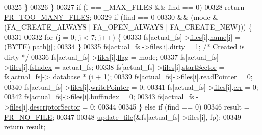 \begin{DoxyCode}
00325     \}
00326   \}
00327   \textcolor{keywordflow}{if} (i == \_MAX\_FILES && find == 0)
00328     \textcolor{keywordflow}{return} \hyperlink{fileSystem_8h_a49d0171ecbd362cda5680a0d360db44cac7926e01d7519a1a7e21a44e2dd76789}{FR\_TOO\_MANY\_FILES};
00329   \textcolor{keywordflow}{if} (find == 0
00330       && (mode & (FA\_CREATE\_ALWAYS | FA\_OPEN\_ALWAYS | FA\_CREATE\_NEW))) \{
00331 
00332     \textcolor{keywordflow}{for} (j = 0; j < 7; j++) \{
00333       fs[actual\_fs]->\hyperlink{structFS_a5772298ea6aafc77f842037933531a02}{files}[i].\hyperlink{structFIL_a21240fe08417eb46f794e67519bf4a58}{name}[j] = (BYTE) path[j];
00334     \}
00335     fs[actual\_fs]->\hyperlink{structFS_a5772298ea6aafc77f842037933531a02}{files}[i].\hyperlink{structFIL_a32847fe875861954ec3dc750d332a194}{dirty} = 1; \textcolor{comment}{/* Created is dirty */}
00336     fs[actual\_fs]->\hyperlink{structFS_a5772298ea6aafc77f842037933531a02}{files}[i].\hyperlink{structFIL_ac409508881f5a16f2998ae675072b376}{flag} = mode;
00337     fs[actual\_fs]->\hyperlink{structFS_a5772298ea6aafc77f842037933531a02}{files}[i].\hyperlink{structFIL_ab32bf8d0b478b2cef4942b2128f4f5f5}{fsIndex} = actual\_fs;
00338     fs[actual\_fs]->\hyperlink{structFS_a5772298ea6aafc77f842037933531a02}{files}[i].\hyperlink{structFIL_a684d4d555f293b08b8396c35e20706d3}{startSector} = fs[actual\_fs]->
      \hyperlink{structFS_a727068deba19f90b5b402ae005f49b58}{database} * (i + 1);
00339     fs[actual\_fs]->\hyperlink{structFS_a5772298ea6aafc77f842037933531a02}{files}[i].\hyperlink{structFIL_ad0d1f48655e0e06936cb7883993afb1f}{readPointer} = 0;
00340     fs[actual\_fs]->\hyperlink{structFS_a5772298ea6aafc77f842037933531a02}{files}[i].\hyperlink{structFIL_a89e92b4845c72b4f9f119b38d1142a41}{writePointer} = 0;
00341     fs[actual\_fs]->\hyperlink{structFS_a5772298ea6aafc77f842037933531a02}{files}[i].\hyperlink{structFIL_aea440945db26de9c4a88065c0c887fda}{err} = 0;
00342     fs[actual\_fs]->\hyperlink{structFS_a5772298ea6aafc77f842037933531a02}{files}[i].\hyperlink{structFIL_a5fb6271e3cc261b9f811bb8860cb6110}{buffindex} = 0;
00343     fs[actual\_fs]->\hyperlink{structFS_a5772298ea6aafc77f842037933531a02}{files}[i].\hyperlink{structFIL_a043930088c6fdc5e523500b833106476}{descriptorSector} = 0;
00344 
00345   \} \textcolor{keywordflow}{else} \textcolor{keywordflow}{if} (find == 0)
00346     result = \hyperlink{fileSystem_8h_a49d0171ecbd362cda5680a0d360db44ca97da8f98fc2e66d8fa7847f9ebb19b8c}{FR\_NO\_FILE};
00347 
00348   \hyperlink{fileSystem_8c_aa4ef3507a98f8090aa382f4015cebe78}{update\_file}(&fs[actual\_fs]->files[i], fp);
00349   \textcolor{keywordflow}{return} result;

\end{DoxyCode}
